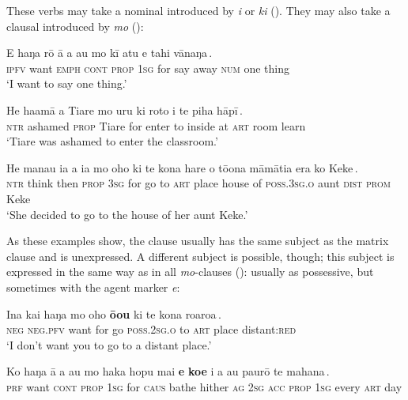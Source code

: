 These verbs may take a nominal  introduced by \textit{i} or \textit{ki} (). They may also take a clausal  introduced by \textit{mo} ():

\ea\label{ex:11.70}
\gll E haŋa rō {\ꞌ}ā a au {\ob}mo kī atu e tahi vānaŋa\,{\cb}. \\
\textsc{ipfv} want \textsc{emph} \textsc{cont} \textsc{prop} \textsc{1sg} {\db}for say away \textsc{num} one thing \\

\glt 
‘I want to say one thing.’ \textstyleExampleref{[R447.025]} 
\z

\ea\label{ex:11.71}
\gll He ha{\ꞌ}amā a Tiare {\ob}mo uru ki roto i te piha hāpī\,{\cb}. \\
\textsc{ntr} ashamed \textsc{prop} Tiare {\db}for enter to inside at \textsc{art} room learn \\

\glt 
‘Tiare was ashamed to enter the classroom.’ \textstyleExampleref{[R334.032]} 
\z

\ea\label{ex:11.72}
\gll He mana{\ꞌ}u ia a ia {\ob}mo oho ki te kona hare o tō{\ꞌ}ona  māmātia era ko Keke\,{\cb}.\\
\textsc{ntr} think then \textsc{prop} \textsc{3sg} {\db}for go to \textsc{art} place house of \textsc{poss.3sg.o}  aunt \textsc{dist} \textsc{prom} Keke\\

\glt
‘She decided to go to the house of her aunt Keke.’ \textstyleExampleref{[R345.090]} 
\z

As these examples show, the  clause usually has the same subject as the matrix clause and is unexpressed. A different subject is possible, though; this subject is expressed in the same way as in all \textit{mo}-clauses (): usually as possessive, but sometimes with the agent marker \textit{e}:

\ea\label{ex:11.73}
\gll {\ꞌ}Ina kai haŋa {\ob}mo oho \textbf{ō{\ꞌ}ou} ki te kona roaroa\,{\cb}. \\
\textsc{neg} \textsc{neg.pfv} want {\db}for go \textsc{poss.2sg.o} to \textsc{art} place distant:\textsc{red} \\

\glt 
‘I don’t want you to go to a distant place.’ \textstyleExampleref{[R210.018]} 
\z

\ea\label{ex:11.74}
\gll Ko haŋa {\ꞌ}ā a au {\ob}mo haka hopu mai \textbf{e} \textbf{koe} i a au  paurō te mahana\,{\cb}.\\
\textsc{prf} want \textsc{cont} \textsc{prop} \textsc{1sg} {\db}for \textsc{caus} bathe hither \textsc{ag} \textsc{2sg} \textsc{acc} \textsc{prop} \textsc{1sg}  every \textsc{art} day\\

